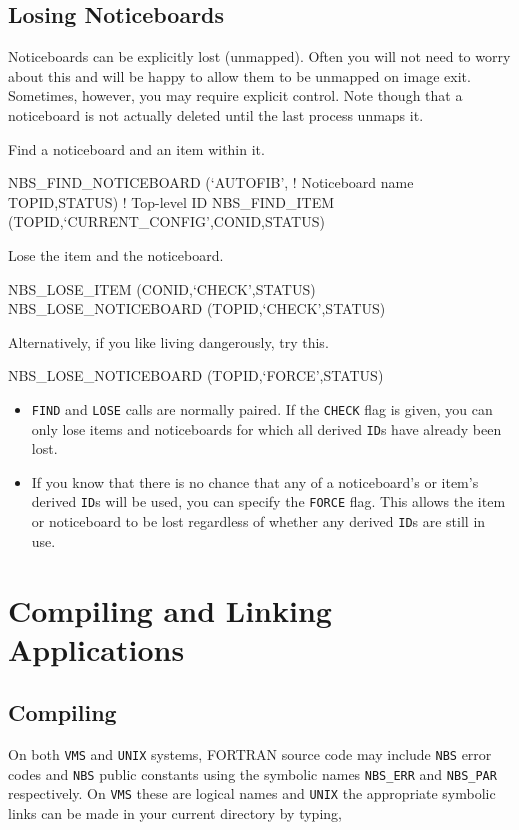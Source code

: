 \documentclass[twoside,11pt,nolof]{starlink}
\begin{document}
\subsection {Losing Noticeboards}

Noticeboards can be explicitly lost (unmapped). Often you will not need to
worry about this and will be happy to allow them to be unmapped on image exit.
Sometimes, however, you may require explicit control. Note though that a
noticeboard is not actually deleted until the last process unmaps it.

Find a noticeboard and an item within it.

\begin{terminalv}
NBS_FIND_NOTICEBOARD (`AUTOFIB',          ! Noticeboard name
                      TOPID,STATUS)       ! Top-level ID
NBS_FIND_ITEM (TOPID,`CURRENT_CONFIG',CONID,STATUS)
\end{terminalv}

Lose the item and the noticeboard.

\begin{terminalv}
NBS_LOSE_ITEM (CONID,`CHECK',STATUS)
NBS_LOSE_NOTICEBOARD (TOPID,`CHECK',STATUS)
\end{terminalv}

Alternatively, if you like living dangerously, try this.

\begin{terminalv}
NBS_LOSE_NOTICEBOARD (TOPID,`FORCE',STATUS)
\end{terminalv}

\begin{itemize}
\item \texttt{FIND} and \texttt{LOSE} calls are normally paired. If the \texttt{CHECK}
flag is given, you can only lose items and noticeboards for which all derived
\texttt{ID}s have already been lost.
\item If you know that there is no chance that any of a noticeboard's or item's
derived \texttt{ID}s will be used, you can specify the \texttt{FORCE} flag. This
allows the item or noticeboard to be lost regardless of whether any derived
\texttt{ID}s are still in use.
\end{itemize}

\section {Compiling and Linking Applications}

\subsection{Compiling}
On both \texttt{VMS} and \texttt{UNIX} systems, FORTRAN source code may
include \texttt{NBS} error codes and \texttt{NBS} public constants using
the symbolic names \texttt{NBS\_ERR} and \texttt{NBS\_PAR} respectively.
On \texttt{VMS} these are logical names and \texttt{UNIX} the appropriate
symbolic links can be made in your current directory by typing,
\end{document}
